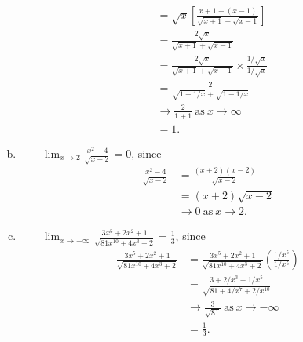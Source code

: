 \documentclass[12pt]{article}
\begin{document}
\begin{enumerate}[a)]
\begin{equation*}
\begin{split}
        \\
        & = \sqrt{x} \left[ \frac{x+1 - (x-1)}{\sqrt{x+1} + \sqrt{x-1}} \right]
        \\
        & = \frac{2 \sqrt{x}}{\sqrt{x+1} + \sqrt{x-1}}
        \\
        & = \frac{2 \sqrt{x}}{\sqrt{x+1} + \sqrt{x-1}} \times
        \frac{1/\sqrt{x}}{1/\sqrt{x}}
        \\
        & = \frac{2}{\sqrt{1 + 1/x} + \sqrt{1 - 1/x}} 
        \\
        & \to \frac{2}{1 + 1} \ \text{as} \ x \to \infty
        \\
        & = 1.
        \end{split}
        \end{equation*}
        \item{}
            \vspace{8em}
        $\qquad \displaystyle \lim_{x \to 2} \frac{x^{2} - 4}{ \sqrt{x -2}}= 0 $, since
        \begin{equation*}
        \begin{split}
          \frac{x^{2} - 4}{\sqrt{x-2}} & = \frac{(x+2)(x-2)}{\sqrt{x-2}} 
          \\
          & = (x+2)\sqrt{x-2}
          \\
          & \to 0 \ \text{as} \ x \to 2.
        \end{split}
        \end{equation*}
        \item{}
            \vspace{8em}
            $\qquad \displaystyle \lim_{x \to -\infty} \frac{3x^{5} + 2x^{2} + 1}{\sqrt{81x^{10}  + 4x^{3} + 2}} = \frac{1}{3}$, since
            \begin{equation*}
            \begin{split}
            \frac{3x^{5} + 2x^{2} + 1}{\sqrt{81x^{10}  + 4x^{3} + 2}} 
            & = \frac{3x^{5} + 2x^{2} + 1}{\sqrt{81x^{10}  + 4x^{3} + 2}}\left( \frac{1/x^{5}}{1/x^{5}} \right) 
            \\
            & = \frac{3 + 2/x^{3} + 1/x^{5}}{\sqrt{81  + 4/x^{7} + 2/x^{10}}} 
            \\
            & \to \frac{3}{\sqrt{81}} \ \text{as} \ x \to -\infty
            \\
            & = \frac{1}{3}.
            \end{split}
            \end{equation*}
\end{enumerate}
\end{document}

